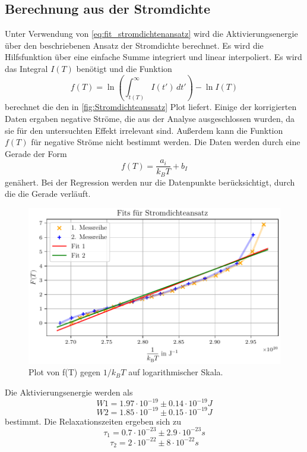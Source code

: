 \subsection{Berechnung aus der Stromdichte}
Unter Verwendung von \ref{eq:fit_stromdichtenansatz} wird die Aktivierungsenergie über den beschriebenen Ansatz der Stromdichte 
berechnet. Es wird die Hilfsfunktion über eine einfache Summe integriert und linear interpoliert.
Es wird das Integral $I(T)$ benötigt und die Funktion 
\begin{equation}
f(T) = \ln \left( \int_{t(T)}^{\infty} I(t') \, dt' \right) - \ln I(T)
\end{equation}
berechnet die den in \ref{fig:Stromdichteanssatz} Plot liefert. Einige der korrigierten Daten ergaben negative Ströme,
die aus der Analyse ausgeschlossen wurden, da sie für den untersuchten Effekt irrelevant sind.
Außerdem kann die Funktion $f(T)$ für negative Ströme nicht bestimmt werden. Die Daten werden durch eine Gerade der Form 
\begin{equation}
    f(T)=\frac{a_i}{k_BT}+b_I
\end{equation}
genähert. Bei der Regression werden nur die Datenpunkte berücksichtigt, durch die die Gerade verläuft.


\begin{figure}[H]
    \centering
    \includegraphics[width=\textwidth]{plots/H_stromdichte.pdf}
    \caption{Plot von f(T) gegen $1/k_BT$ auf logarithmischer Skala.}
    \label{fig:Stromdichteansatz}
\end{figure}

Die Aktivierungsenergie werden als 
\begin{equation}
W1   = 1.97\cdot10^{-19}\pm0.14\cdot10^{-19}J
\end{equation} 
\begin{equation}
 W2   = 1.85\cdot10^{-19}\pm0.15\cdot10^{-19}J
\end{equation} 
bestimmt.
Die Relaxationszeiten ergeben sich zu
\begin{equation}
\tau_1 = 0.7\cdot10^{-23}\pm2.9\cdot10^{-23}s
\end{equation} 
\begin{equation}
\tau_2 = 2\cdot10^{-22}\pm8\cdot10^{-22}s
\end{equation} 

